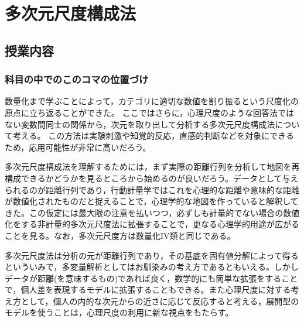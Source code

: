 \section{多次元尺度構成法}
\subsection{授業内容}
\subsubsection{科目の中でのこのコマの位置づけ}
数量化まで学ぶことによって，カテゴリに適切な数値を割り振るという尺度化の原点に立ち返ることができた。
ここではさらに，心理尺度のような回答法ではない変数間同士の関係から，次元を取り出して分析する多次元尺度構成法について考える。
この方法は実験刺激や知覚的反応，直感的判断などを対象にできるため，応用可能性が非常に高いだろう。

多次元尺度構成法を理解するためには，まず実際の距離行列を分析して地図を再構成できるかどうかを見るところから始めるのが良いだろう。データとして与えられるのが距離行列であり，行動計量学ではこれを心理的な距離や意味的な距離が数値化されたものだと捉えることで，心理学的な地図を作っていると解釈してきた。この仮定には最大限の注意を払いつつ，必ずしも計量的でない場合の数値化をする非計量的多次元尺度法に拡張することで，更なる心理学的用途が広がることを見る。なお，多次元尺度方は数量化IV類と同じである。

多次元尺度法は分析の元が距離行列であり，その基底を固有値分解によって得るといういみで，多変量解析としてはお馴染みの考え方であるともいえる。しかしデータが距離(を意味するもの)であれば良く，数学的にも簡単な拡張をすることで，個人差を表現するモデルに拡張することもできる。また心理尺度に対する考え方として，個人の内的な次元からの近さに応じて反応すると考える，展開型のモデルを使うことは，心理尺度の利用に新な視点をもたらす。

